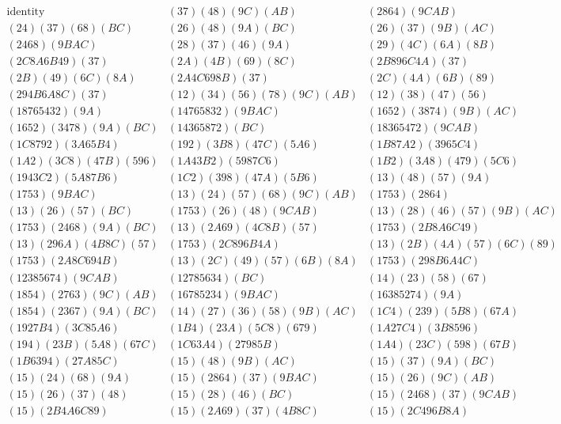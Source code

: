 \begin{table}[p]
{\scsi $$
\begin{array}{lll}
\mbox{identity} & (37)(48)(9C)(AB) & (2864)(9CAB)\\
(24)(37)(68)(BC) & (26)(48)(9A)(BC) & (26)(37)(9B)(AC)\\
(2468)(9BAC) & (28)(37)(46)(9A) & (29)(4C)(6A)(8B)\\
(2C8A6B49)(37) & (2A)(4B)(69)(8C) & (2B896C4A)(37)\\
(2B)(49)(6C)(8A) & (2A4C698B)(37) & (2C)(4A)(6B)(89)\\
(294B6A8C)(37) & (12)(34)(56)(78)(9C)(AB) & (12)(38)(47)(56)\\
(18765432)(9A) & (14765832)(9BAC) & (1652)(3874)(9B)(AC)\\
(1652)(3478)(9A)(BC) & (14365872)(BC) & (18365472)(9CAB)\\
(1C8792)(3A65B4) & (192)(3B8)(47C)(5A6) & (1B87A2)(3965C4)\\
(1A2)(3C8)(47B)(596) & (1A43B2)(5987C6) & (1B2)(3A8)(479)(5C6)\\
(1943C2)(5A87B6) & (1C2)(398)(47A)(5B6) & (13)(48)(57)(9A)\\
(1753)(9BAC) & (13)(24)(57)(68)(9C)(AB) & (1753)(2864)\\
(13)(26)(57)(BC) & (1753)(26)(48)(9CAB) & (13)(28)(46)(57)(9B)(AC)\\
(1753)(2468)(9A)(BC) & (13)(2A69)(4C8B)(57) & (1753)(2B8A6C49)\\
(13)(296A)(4B8C)(57) & (1753)(2C896B4A) & (13)(2B)(4A)(57)(6C)(89)\\
(1753)(2A8C694B) & (13)(2C)(49)(57)(6B)(8A) & (1753)(298B6A4C)\\
(12385674)(9CAB) & (12785634)(BC) & (14)(23)(58)(67)\\
(1854)(2763)(9C)(AB) & (16785234)(9BAC) & (16385274)(9A)\\
(1854)(2367)(9A)(BC) & (14)(27)(36)(58)(9B)(AC) & (1C4)(239)(5B8)(67A)\\
(1927B4)(3C85A6) & (1B4)(23A)(5C8)(679) & (1A27C4)(3B8596)\\
(194)(23B)(5A8)(67C) & (1C63A4)(27985B) & (1A4)(23C)(598)(67B)\\
(1B6394)(27A85C) & (15)(48)(9B)(AC) & (15)(37)(9A)(BC)\\
(15)(24)(68)(9A) & (15)(2864)(37)(9BAC) & (15)(26)(9C)(AB)\\
(15)(26)(37)(48) & (15)(28)(46)(BC) & (15)(2468)(37)(9CAB)\\
(15)(2B4A6C89) & (15)(2A69)(37)(4B8C) & (15)(2C496B8A)\\

\end{array}$$}
\end{table}
